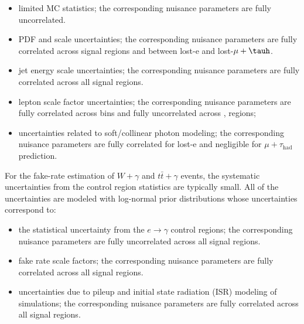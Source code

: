 \begin{itemize}
 \item limited MC statistics; the corresponding nuisance parameters are fully uncorrelated.
 \item PDF and scale uncertainties; the corresponding nuisance parameters are fully correlated across signal regions and between lost-e and lost-$\mu+\tauh$.
 \item jet energy scale uncertainties; the corresponding nuisance parameters are fully correlated across all signal regions.
 \item lepton scale factor uncertainties; the corresponding nuisance parameters are fully correlated across \ptmiss bins and fully uncorrelated across \nb, \nj regions;
 \item uncertainties related to soft/collinear photon modeling; the corresponding nuisance parameters are fully correlated
 for lost-e and negligible for $\mu+\tau_{\mathrm{had}}$ prediction.
\end{itemize}
For the fake-rate estimation of $W+\gamma$ and $t\bar{t}+\gamma$ events, the systematic uncertainties
from the control region statistics are typically small.  All of the uncertainties
are modeled with log-normal prior distributions whose uncertainties
correspond to:

\begin{itemize}
 \item the statistical uncertainty from the $e\rightarrow\gamma$ control regions; the corresponding nuisance parameters are fully uncorrelated across all signal regions.
 \item fake rate scale factors; the corresponding nuisance parameters are fully correlated across all signal regions.
 \item uncertainties due to pileup and initial state radiation (ISR) modeling of simulations; the corresponding nuisance parameters are fully correlated across all signal regions.
\end{itemize}

